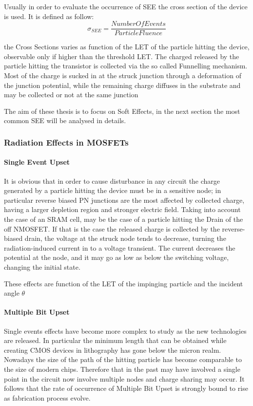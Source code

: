 \documentclass[./dissertation.tex]{subfiles}
\begin{document}
Usually in order to evaluate the occurrence of SEE the cross section of the device is used. It is defined as follow:
\begin{equation}
    \sigma_{SEE} = \frac{NumberOfEvents}{ParticleFluence}
\end{equation}

the Cross Sections varies as function of the LET of the particle hitting the device, observable only if higher than the threshold LET. The charged released by the particle hitting the transistor is collected via the so called Funnelling mechanism. Most of the charge is sucked in at the struck junction through a deformation of the junction potential, while the remaining charge diffuses in the substrate and may be collected or not at the same junction\cite{bib1}

The aim of these thesis is to focus on Soft Effects, in the next section the most common SEE will be analysed in details.

\subsubsection{Radiation Effects in MOSFETs}
\paragraph{Single Event Upset}
It is obvious that in order to cause disturbance in any circuit the charge generated by a particle hitting the device must be in a sensitive node; in particular reverse biased PN junctions are the most affected by collected charge, having a larger depletion region and stronger electric field. Taking into account the case of an SRAM cell, may be the case of a particle hitting the Drain of the off NMOSFET. If that is the case the released charge is collected by the reverse-biased drain, the voltage at the struck node tends to decrease, turning the radiation-induced current in to a voltage transient. The current decreases the potential at the node, and it may go as low as below the switching voltage, changing the initial state.

These effects are function of the LET of the impinging particle and the incident angle $\theta$

\paragraph{Multiple Bit Upset}
Single events effects have become more complex  to study as the new technologies are released. In particular the minimum length that can be obtained while creating CMOS devices in lithography has gone below the micron realm. Nowadays the size of the path of the hitting particle has become comparable to the size of modern chips. Therefore that in the past may have involved a single point in the circuit now involve multiple nodes and charge sharing may occur. It follows that the rate of occurrence of Multiple Bit Upset is strongly bound to rise as fabrication process evolve.
\end{document}
